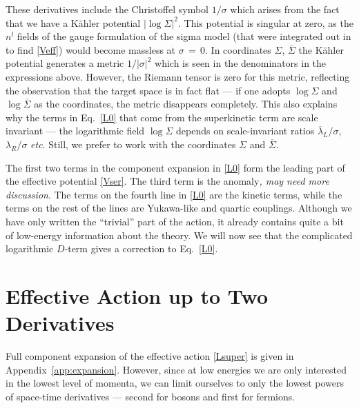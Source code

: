 \documentclass[epsfig,12pt]{article}
\newcommand{\ov}{\overline}
\begin{document}
	These derivatives include the Christoffel symbol $ 1 / \sigma $ which arises from
	the fact that we have a  K\"ahler potential $ \big| \log \Sigma \big|^2 $.
	This potential is singular at zero, as the $ n^l $ fields of the 
	gauge formulation of the sigma model 
	(that were integrated out in \cite{SYhet} to find \eqref{Veff}) 
	would become massless at $ \sigma \,=\, 0 $.
	In coordinates $ \Sigma $, $ \ov\Sigma $ the K\"ahler potential generates a metric $ 1 / |\sigma|^2 $
	which is seen in the denominators in the expressions above.
	However, the Riemann tensor is zero for this metric, reflecting the
	observation that the target space is in fact flat ---
	if one adopts $ \log \Sigma $ and $ \log \ov\Sigma $ as the coordinates, the metric
	disappears completely.
	This also explains why the terms in Eq.~\eqref{L0} that come from the
	superkinetic term are scale invariant ---
	the logarithmic field $ \log \Sigma $ depends on scale-invariant ratios
	$ \ov\lambda{}_L/\sigma $, $ \lambda_R/\sigma $ {\it etc}.
	Still, we prefer to work with the coordinates $ \Sigma $ and $ \ov\Sigma $.

	The first two terms in the component expansion in \eqref{L0} form the 
	leading part of the effective potential \eqref{Vser}.
	The third term is the anomaly{\it, may need more discussion}.
	The terms on the fourth line in \eqref{L0} are the kinetic terms, 
	while the terms on the rest of the lines are Yukawa-like and quartic couplings.
	Although we have only written the ``trivial'' part of the action,
	it already contains quite a bit of low-energy information about the theory.
	We will now see that the complicated logarithmic $ D $-term gives a
	correction to Eq.~\eqref{L0}.


\section{Effective Action up to Two Derivatives}
\label{saction}
	Full component expansion of the effective action \eqref{Lsuper} is given
	in Appendix~\ref{app:expansion}.
	However, since at low energies we are only interested in the lowest level
	of momenta, we can limit ourselves to only the lowest powers of 
	space-time derivatives --- second for bosons and first for fermions.
\end{document}
